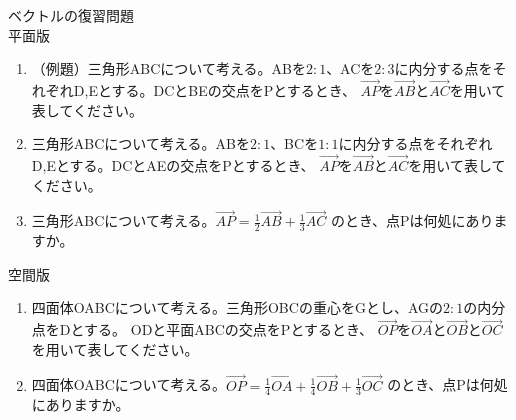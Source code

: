 \documentclass[12pt,a4paper]{jsarticle}
\begin{document}
ベクトルの復習問題
\\
平面版
\begin{enumerate}
    \item （例題）三角形ABCについて考える。ABを$2:1$、ACを$2:3$に内分する点をそれぞれD,Eとする。DCとBEの交点をPとするとき、
    $\overrightarrow{AP}$を$\overrightarrow{AB}$と$\overrightarrow{AC}$を用いて表してください。
    \item 三角形ABCについて考える。ABを$2:1$、BCを$1:1$に内分する点をそれぞれD,Eとする。DCとAEの交点をPとするとき、
    $\overrightarrow{AP}$を$\overrightarrow{AB}$と$\overrightarrow{AC}$を用いて表してください。
    \item 三角形ABCについて考える。$\overrightarrow{AP}=\frac{1}{2}\overrightarrow{AB}+\frac{1}{3}\overrightarrow{AC}$
    のとき、点Pは何処にありますか。
\end{enumerate}
空間版
\begin{enumerate}
    \item 四面体OABCについて考える。三角形OBCの重心をGとし、AGの$2:1$の内分点をDとする。
    ODと平面ABCの交点をPとするとき、
    $\overrightarrow{OP}$を$\overrightarrow{OA}$と$\overrightarrow{OB}$と$\overrightarrow{OC}$を用いて表してください。
    \item 四面体OABCについて考える。$\overrightarrow{OP}=\frac{1}{4}\overrightarrow{OA}+\frac{1}{4}\overrightarrow{OB}+\frac{1}{3}\overrightarrow{OC}$
    のとき、点Pは何処にありますか。
\end{enumerate}
\end{document}
